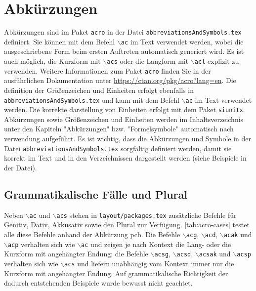 \section{Abkürzungen}
\acresetall %
Abkürzungen sind im Paket \texttt{acro} in der Datei \texttt{abbreviationsAndSymbols.tex} definiert. Sie können mit dem Befehl \texttt{$\backslash$ac} im Text verwendet werden, wobei die ausgeschriebene Form beim ersten Auftreten automatisch generiert wird. Es ist auch möglich, die Kurzform mit \texttt{$\backslash$acs} oder die Langform mit \texttt{$\backslash$acl} explizit zu verwenden. Weitere Informationen zum Paket \texttt{acro} finden Sie in der ausführlichen Dokumentation unter \url{https://ctan.org/pkg/acro?lang=en}.
Die definition der Größenzeichen und Einheiten erfolgt ebenfalls in \texttt{abbreviationsAndSymbols.tex} und kann mit dem Befehl \texttt{$\backslash$ac} im Text verwendet werden. Die korrekte darstellung von Einheiten erfolgt mit dem Paket \texttt{siunitx}.
Abkürzungen sowie Größenzeichen und Einheiten werden im Inhaltsverzeichnis unter den Kapiteln "Abkürzungen" bzw. "Formelsymbole" automatisch nach verwendung aufgeführt. Es ist wichtig, dass die Abkürzungen und Symbole in der Datei \texttt{abbreviationsAndSymbols.tex} sorgfältig definiert werden, damit sie korrekt im Text und in den Verzeichnissen dargestellt werden (siehe Beispiele in der Datei).

\subsection{Grammatikalische Fälle und Plural}
Neben \texttt{$\backslash$ac} und \texttt{$\backslash$acs} stehen in \texttt{layout/packages.tex} zusätzliche Befehle für Genitiv, Dativ, Akkusativ sowie den Plural zur Verfügung. \autoref{tab:acro-cases} testet alle diese Befehle anhand der Abkürzung \ac{pcb}. Die Befehle \texttt{$\backslash$acg}, \texttt{$\backslash$acd}, \texttt{$\backslash$acak} und \texttt{$\backslash$acp} verhalten sich wie \texttt{$\backslash$ac} und zeigen je nach Kontext die Lang- oder die Kurzform mit angehängter Endung; die Befehle \texttt{$\backslash$acsg}, \texttt{$\backslash$acsd}, \texttt{$\backslash$acsak} und \texttt{$\backslash$acsp} verhalten sich wie \texttt{$\backslash$acs} und liefern unabhängig vom Kontext immer nur die Kurzform mit angehängter Endung. Auf grammatikalische Richtigkeit der dadurch entstehenden Beispiele wurde bewusst nicht geachtet.

